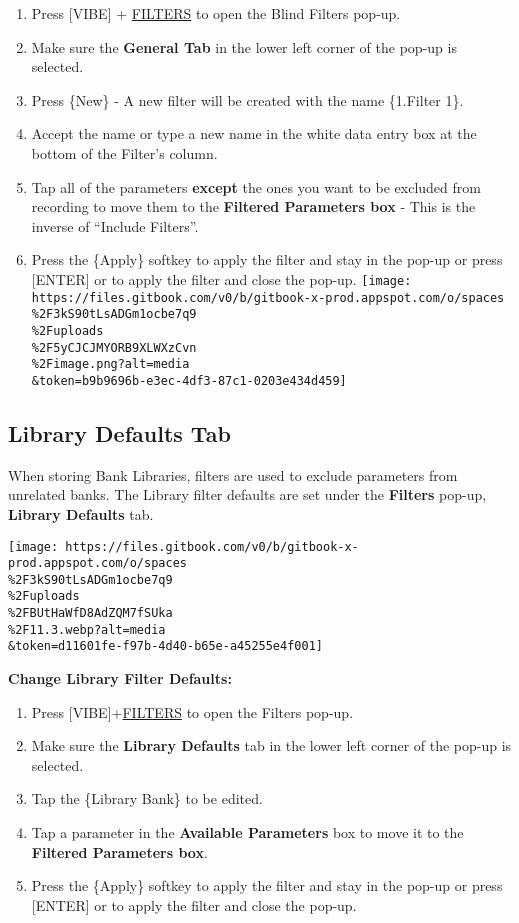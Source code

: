 \documentclass[
]{article}
\begin{document}
\begin{enumerate}
\def\labelenumi{\arabic{enumi}.}
\item
  Press {[}VIBE{]} + \protect\hyperlink{filters}{FILTERS} to open the Blind Filters pop-up.
\item
  Make sure the \textbf{General Tab} in the lower left corner of the pop-up is selected.
\item
  Press \{New\} - A new filter will be created with the name \{1.Filter 1\}.
\item
  Accept the name or type a new name in the white data entry box at the bottom of the Filter's column.
\item
  Tap all of the parameters \textbf{except} the ones you want to be excluded from recording to move them to the \textbf{Filtered Parameters box} - This is the inverse of ``Include Filters''.
\item
  Press the \{Apply\} softkey to apply the filter and stay in the pop-up or press {[}ENTER{]} or to apply the filter and close the pop-up.
  \texttt{[image: https://files.gitbook.com/v0/b/gitbook-x-prod.appspot.com/o/spaces\\\%2F3kS90tLsADGm1ocbe7q9\\\%2Fuploads\\\%2F5yCJCJMYORB9XLWXzCvn\\\%2Fimage.png?alt=media\\\&token=b9b9696b-e3ec-4df3-87c1-0203e434d459]}
\end{enumerate}

\hypertarget{library-defaults-tab}{%
\subsection{Library Defaults Tab}\label{library-defaults-tab}}

When storing Bank Libraries, filters are used to exclude parameters from unrelated banks. The Library filter defaults are set under the \textbf{Filters} pop-up, \textbf{Library Defaults} tab.

\texttt{[image: https://files.gitbook.com/v0/b/gitbook-x-prod.appspot.com/o/spaces\\\%2F3kS90tLsADGm1ocbe7q9\\\%2Fuploads\\\%2FBUtHaWfD8AdZQM7fSUka\\\%2F11.3.webp?alt=media\\\&token=d11601fe-f97b-4d40-b65e-a45255e4f001]}

\textbf{Change Library Filter Defaults:}

\begin{enumerate}
\def\labelenumi{\arabic{enumi}.}
\item
  Press {[}VIBE{]}+\protect\hyperlink{filters}{FILTERS} to open the Filters pop-up.
\item
  Make sure the \textbf{Library Defaults} tab in the lower left corner of the pop-up is selected.
\item
  Tap the \{Library Bank\} to be edited.
\item
  Tap a parameter in the \textbf{Available Parameters} box to move it to the \textbf{Filtered Parameters box}.
\item
  Press the \{Apply\} softkey to apply the filter and stay in the pop-up or press {[}ENTER{]} or \href{image.png}{} to apply the filter and close the pop-up.
\end{enumerate}
\end{document}
